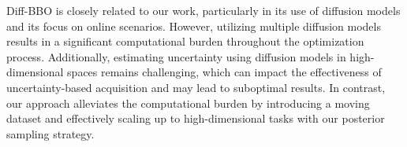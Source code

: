 Diff-BBO is closely related to our work, particularly in its use of diffusion models and its focus on online scenarios. However, utilizing multiple diffusion models results in a significant computational burden throughout the optimization process. Additionally, estimating uncertainty using diffusion models in high-dimensional spaces remains challenging, which can impact the effectiveness of uncertainty-based acquisition and may lead to suboptimal results.
In contrast, our approach alleviates the computational burden by introducing a moving dataset and effectively scaling up to high-dimensional tasks with our posterior sampling strategy.






